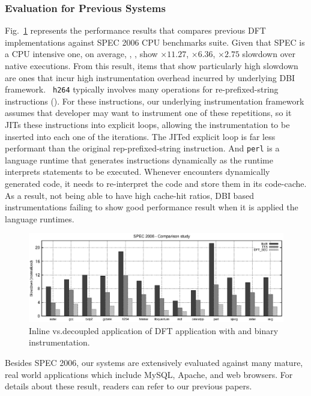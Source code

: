 \subsubsection{Evaluation for Previous Systems}
\label{ssec:prev_eval}

Fig.~\ref{fig:s2k6} represents the performance results that compares previous
DFT implementations against SPEC 2006 CPU benchmarks suite. Given that SPEC is
a CPU intensive one, on average, \libdft, \tfa, \sreplica show $\times 11.27$,
$\times 6.36$, $\times 2.75$ slowdown over native executions.
%
From this result, items that show particularly high slowdown are ones that
incur high instrumentation overhead incurred by underlying DBI framework. {\tt
h264} typically involves many operations for re-prefixed-string instructions
(). For these instructions, our
underlying instrumentation framework \ie \pin assumes that developer may want
to instrument one of these repetitions, so it JITs these instructions into
explicit loops, allowing the instrumentation to be inserted into each one of
the iterations. The JITed explicit loop is far less performant than the
original rep-prefixed-string instruction. 
%
And {\tt perl} is a language runtime that generates instructions dynamically as
the runtime interprets statements to be executed. Whenever \pin encounters
dynamically generated code, it needs to re-interpret the code and store them in
its code-cache. As a result, not being able to have high cache-hit ratios, DBI
based instrumentations failing to show good performance result when it is
applied the language runtimes. 

\begin{figure}[tb]
    \centering
    \includegraphics[width=\linewidth]{figs/s2k6.eps}
    \caption{Inline vs.decoupled application of DFT application with \sreplica
    and binary instrumentation.\label{fig:s2k6}}
\end{figure}

Besides SPEC 2006, our systems are extensively evaluated against many mature,
real world applications which include MySQL, Apache, and web browsers. For
details about these result, readers can refer to our previous papers.

